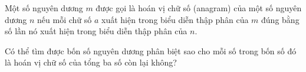 \ifshowproblem
\begin{problem}\label{example:BMO-2015-P7}
    Một số nguyên dương \( m \) được gọi là hoán vị chữ số (anagram) của một số nguyên dương \( n \)
    nếu mỗi chữ số \( a \) xuất hiện trong biểu diễn thập phân của \( m \) đúng bằng số lần nó xuất hiện trong biểu diễn thập phân của \( n \).

    Có thể tìm được bốn số nguyên dương phân biệt sao cho mỗi số trong bốn số đó là hoán vị chữ số của tổng ba số còn lại không?
\end{problem}
\fi

\footnotemark
{}
\fi